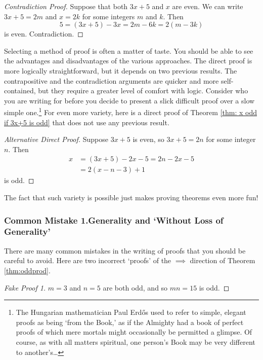 \begin{proof}[Contradiction Proof] Suppose that both $3x+5$ and $x$ are even. We can write $3x+5=2m$  and $x=2k$ for some integers $m$ and $k$. Then
  \[5= (3x+5)-3x = 2m - 6k=2(m-3k)\]
  is even. Contradiction.
\end{proof}

\noindent Selecting a method of proof is often a matter of taste. You should be able to see the advantages and disadvantages of the various approaches. The direct proof is more logically straightforward, but it depends on two previous results. The contrapositive and the contradiction arguments are quicker and more self-contained, but they require a greater level of comfort with logic. Consider who you are writing for before you decide to present a slick difficult proof over a slow simple one.\footnote{The Hungarian mathematician Paul Erdős used to refer to simple, elegant proofs as being `from the Book,' as if the Almighty had a book of perfect proofs of which mere mortals might occasionally be permitted a glimpse. Of course, as with all matters spiritual, one person's Book may be very different to another's\ldots} For even more variety, here is a direct proof of Theorem \ref{thm: x odd if 3x+5 is odd} that does not use any previous result.

\begin{proof}[Alternative Direct Proof]
Suppose $3x+5$ is even, so $3x+5=2n$ for some integer $n$. Then
\begin{align*}
x&= (3x+5)-2x-5=2n-2x-5\\
&=2(x-n-3)+1
\end{align*}
is odd.
\end{proof} 
The fact that such variety is possible just makes proving theorems even more fun!




\subsubsection*{Common Mistake 1.\quad Generality and `Without Loss of Generality'}

There are many common mistakes in the writing of proofs that you should be careful to avoid. Here are two incorrect `proofs' of the $\implies$ direction of Theorem \ref{thm:oddprod}.

\begin{proof}[Fake Proof 1]
$m=3$ and $n=5$ are both odd, and so $mn=15$ is odd.
\end{proof}

